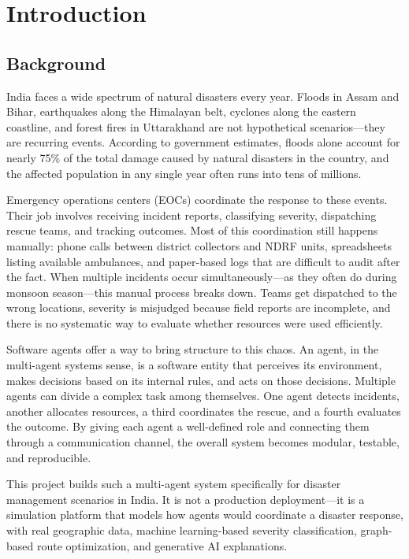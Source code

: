 \chapter{Introduction}
\label{ch:introduction}

\section{Background}
\label{sec:background}

India faces a wide spectrum of natural disasters every year. Floods in Assam and Bihar, earthquakes along the Himalayan belt, cyclones along the eastern coastline, and forest fires in Uttarakhand are not hypothetical scenarios---they are recurring events. According to government estimates, floods alone account for nearly 75\% of the total damage caused by natural disasters in the country, and the affected population in any single year often runs into tens of millions.

Emergency operations centers (EOCs) coordinate the response to these events. Their job involves receiving incident reports, classifying severity, dispatching rescue teams, and tracking outcomes. Most of this coordination still happens manually: phone calls between district collectors and NDRF units, spreadsheets listing available ambulances, and paper-based logs that are difficult to audit after the fact. When multiple incidents occur simultaneously---as they often do during monsoon season---this manual process breaks down. Teams get dispatched to the wrong locations, severity is misjudged because field reports are incomplete, and there is no systematic way to evaluate whether resources were used efficiently.

Software agents offer a way to bring structure to this chaos. An agent, in the multi-agent systems sense, is a software entity that perceives its environment, makes decisions based on its internal rules, and acts on those decisions. Multiple agents can divide a complex task among themselves. One agent detects incidents, another allocates resources, a third coordinates the rescue, and a fourth evaluates the outcome. By giving each agent a well-defined role and connecting them through a communication channel, the overall system becomes modular, testable, and reproducible.

This project builds such a multi-agent system specifically for disaster management scenarios in India. It is not a production deployment---it is a simulation platform that models how agents would coordinate a disaster response, with real geographic data, machine learning-based severity classification, graph-based route optimization, and generative AI explanations.

